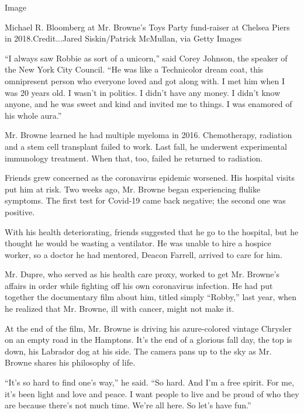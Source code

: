 Image

Michael R. Bloomberg at Mr. Browne's Toys Party fund-raiser at Chelsea
Piers in 2018.Credit...Jared Siskin/Patrick McMullan, via Getty Images

``I always saw Robbie as sort of a unicorn,'' said Corey Johnson, the
speaker of the New York City Council. ``He was like a Technicolor dream
coat, this omnipresent person who everyone loved and got along with. I
met him when I was 20 years old. I wasn't in politics. I didn't have any
money. I didn't know anyone, and he was sweet and kind and invited me to
things. I was enamored of his whole aura.''

Mr. Browne learned he had multiple myeloma in 2016. Chemotherapy,
radiation and a stem cell transplant failed to work. Last fall, he
underwent experimental immunology treatment. When that, too, failed he
returned to radiation.

Friends grew concerned as the coronavirus epidemic worsened. His
hospital visits put him at risk. Two weeks ago, Mr. Browne began
experiencing flulike symptoms. The first test for Covid-19 came back
negative; the second one was positive.

With his health deteriorating, friends suggested that he go to the
hospital, but he thought he would be wasting a ventilator. He was unable
to hire a hospice worker, so a doctor he had mentored, Deacon Farrell,
arrived to care for him.

Mr. Dupre, who served as his health care proxy, worked to get Mr.
Browne's affairs in order while fighting off his own coronavirus
infection. He had put together the documentary film about him, titled
simply ``Robby,'' last year, when he realized that Mr. Browne, ill with
cancer, might not make it.

At the end of the film, Mr. Browne is driving his azure-colored vintage
Chrysler on an empty road in the Hamptons. It's the end of a glorious
fall day, the top is down, his Labrador dog at his side. The camera pans
up to the sky as Mr. Browne shares his philosophy of life.

``It's so hard to find one's way,'' he said. ``So hard. And I'm a free
spirit. For me, it's been light and love and peace. I want people to
live and be proud of who they are because there's not much time. We're
all here. So let's have fun.''

\href{https://www.nytimes3xbfgragh.onion/interactive/2020/obituaries/people-died-coronavirus-obituaries.html?action=click\&pgtype=Article\&state=default\&region=BELOW_MAIN_CONTENT\&context=covid_obits_promo}{}

